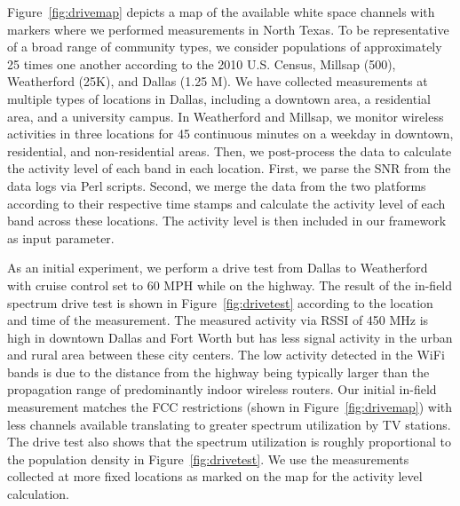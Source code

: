 Figure~\ref{fig:drivemap} depicts a map of the available white space channels with
markers where we performed measurements in North Texas. To be representative of a broad range of
community types, we consider populations of approximately 25 times one another according to the
2010 U.S. Census, Millsap (500), Weatherford (25K), and Dallas (1.25 M).
We have collected measurements at multiple types of locations in Dallas, including a downtown area,
a residential area, and a university campus. In Weatherford and Millsap, we monitor wireless activities 
in three locations for 45 continuous minutes on a weekday in downtown, residential, and non-residential areas.
Then, we post-process the data to calculate the activity level of each band in each location.
First, we parse the SNR from the data logs via Perl scripts. Second, we merge the data from the two platforms
according to their respective time stamps and calculate the activity level of each band across these
locations. The activity level is then included in our framework as input parameter.

As an initial experiment, we perform a drive test from Dallas to Weatherford with cruise control 
set to 60 MPH while on the highway. The result of the in-field spectrum drive test is shown in 
Figure~\ref{fig:drivetest} according to the location and time of the measurement.
The measured activity via RSSI of 450 MHz is high in downtown Dallas and Fort Worth 
but has less signal activity in the urban and rural area between these city centers.
The low activity detected in the WiFi bands is due to the distance from the highway being typically
larger than the propagation range of predominantly indoor wireless routers.
Our initial in-field measurement matches the FCC restrictions (shown in Figure~\ref{fig:drivemap}) with
less channels available translating to greater spectrum utilization by TV stations.
The drive test also shows that the spectrum utilization is roughly proportional to the population
density in Figure~\ref{fig:drivetest}. We use the measurements collected at more fixed locations as marked on the map for
the activity level calculation. 

